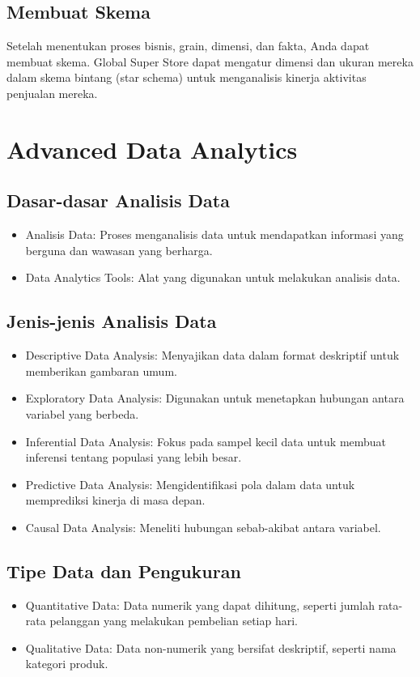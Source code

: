 \documentclass{article}
\begin{document}
\subsection{Membuat Skema}
Setelah menentukan proses bisnis, grain, dimensi, dan fakta, Anda dapat membuat skema. Global Super Store dapat mengatur dimensi dan ukuran mereka dalam skema bintang (star schema) untuk menganalisis kinerja aktivitas penjualan mereka.

\newpage

\section{Advanced Data Analytics}
\subsection{Dasar-dasar Analisis Data}
\begin{itemize}
    \item Analisis Data: Proses menganalisis data untuk mendapatkan informasi yang berguna dan wawasan yang berharga.
    \item Data Analytics Tools: Alat yang digunakan untuk melakukan analisis data.
\end{itemize}

\subsection{Jenis-jenis Analisis Data}
\begin{itemize}
    \item Descriptive Data Analysis: Menyajikan data dalam format deskriptif untuk memberikan gambaran umum.
    \item Exploratory Data Analysis: Digunakan untuk menetapkan hubungan antara variabel yang berbeda.
    \item Inferential Data Analysis: Fokus pada sampel kecil data untuk membuat inferensi tentang populasi yang lebih besar.
    \item Predictive Data Analysis: Mengidentifikasi pola dalam data untuk memprediksi kinerja di masa depan.
    \item Causal Data Analysis: Meneliti hubungan sebab-akibat antara variabel.
\end{itemize}

\subsection{Tipe Data dan Pengukuran}
\begin{itemize}
    \item Quantitative Data: Data numerik yang dapat dihitung, seperti jumlah rata-rata pelanggan yang melakukan pembelian setiap hari.
    \item Qualitative Data: Data non-numerik yang bersifat deskriptif, seperti nama kategori produk.
\end{itemize}
\end{document}
